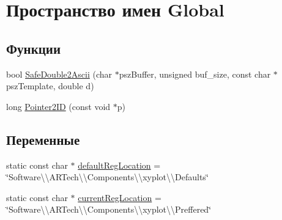 \hypertarget{namespace_global}{\section{Пространство имен Global}
\label{namespace_global}
}
\subsection*{Функции}
\begin{DoxyCompactItemize}
\item 
bool \hyperlink{namespace_global_a2575b2259b368bfa9de6c565037c0421}{Safe\-Double2\-Ascii} (char $\ast$psz\-Buffer, unsigned buf\-\_\-size, const char $\ast$psz\-Template, double d)
\item 
long \hyperlink{namespace_global_a4184aff310844ba1cc80f37f0f5cd9a4}{Pointer2\-I\-D} (const void $\ast$p)
\end{DoxyCompactItemize}
\subsection*{Переменные}
\begin{DoxyCompactItemize}
\item 
static const char $\ast$ \hyperlink{namespace_global_a275f4535b4758f4da12d3e80d2baad33}{default\-Reg\-Location} = \char`\"{}Software\textbackslash{}\textbackslash{}\-A\-R\-Tech\textbackslash{}\textbackslash{}\-Components\textbackslash{}\textbackslash{}xyplot\textbackslash{}\textbackslash{}\-Defaults\char`\"{}
\item 
static const char $\ast$ \hyperlink{namespace_global_a5a9ecda094d018a7aedd0e0fea60dcbf}{current\-Reg\-Location} = \char`\"{}Software\textbackslash{}\textbackslash{}\-A\-R\-Tech\textbackslash{}\textbackslash{}\-Components\textbackslash{}\textbackslash{}xyplot\textbackslash{}\textbackslash{}\-Preffered\char`\"{}
\end{DoxyCompactItemize}


